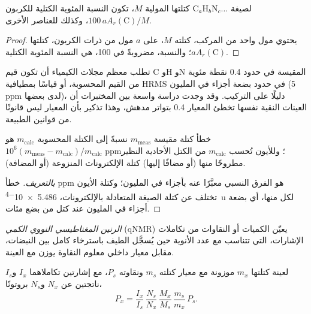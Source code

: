 \begin{proposition}\label{prop:b3:lab-techniques-3:mass-fractions}
لصيغة $\mathrm{C}_a\mathrm{H}_b\mathrm{N}_c\dots$ كتلتها المولية $M$، تكون النسبة المئوية الكتلية للكربون $100\,aA_r(\mathrm C)/M$، وكذلك
للعناصر الأخرى.
\end{proposition}

\begin{proof}
يحتوي مول واحد من المركب، كتلته $M$، على $a$ مول من ذرات الكربون، كتلتها $aA_r(\mathrm C)$؛
والنسبة، مضروبةً في 100، هي النسبة المئوية الكتلية.
\end{proof}

تطلب معظم مجلات الكيمياء أن تكون قيم C وH وN المقيسة في حدود 0.4 نقطة
مئوية من القيم المحسوبة، أو قياسًا بمطيافية HRMS في حدود بضعة أجزاء في المليون (5 ppm
لدى بعضها)، دليلًا على التركيب. وقد وجدت دراسة واسعة بين المختبرات أن
العينات النقية نفسها تخطئ المعيار 0.4 بتواتر مدهش، وهذا تذكير بأن
المعيار ليس قانونًا من قوانين الطبيعة.

\begin{proposition}\label{prop:b3:lab-techniques-3:ppm-error}
خطأ كتلة مقيسة $m_{\mathrm{meas}}$ نسبةً إلى الكتلة المحسوبة $m_{\mathrm{calc}}$ هو
$10^6(m_{\mathrm{meas}} - m_{\mathrm{calc}})/m_{\mathrm{calc}}$ ppm؛ وللأيون تُحسب $m_{\mathrm{calc}}$ من الكتل الأحادية النظير مطروحًا منها (أو مضافًا إليها)
كتلة الإلكترونات المنزوعة (أو المضافة).
\end{proposition}

\begin{proof}[بالتعريف]
خطأ ppm هو الفرق النسبي معبَّرًا عنه بأجزاء في المليون؛ 
وكتلة الأيون تختلف عن كتلة الصيغة المتعادلة بالإلكترونات، \qty{5.486e-4}{u} لكل منها، أي
بضعة أجزاء في المليون عند كتل من بضع مئات.
\end{proof}

\begin{definition}\label{def:b3:lab-techniques-3:qnmr}
\emph{الرنين المغناطيسي النووي الكمي} (qNMR) يعيّن الكميات أو
النقاوات من تكاملات الإشارات، التي تتناسب مع عدد الأنوية
حين يُسجَّل الطيف باسترخاء كامل بين النبضات، مقابل
معيار داخلي معلوم النقاوة يوزن مع العينة.
\end{definition}

\begin{proposition}\label{prop:b3:lab-techniques-3:qnmr}
لعينة كتلتها $m_x$ موزونة مع معيار كتلته $m_s$ ونقاوته $P_s$، مع إشارتين
تكاملاهما $I_x$ و$I_s$ ناتجتين عن $N_x$ و$N_s$ بروتونًا،
\[
  P_x = \frac{I_x}{I_s}\,\frac{N_s}{N_x}\,\frac{M_x}{M_s}\,\frac{m_s}{m_x}\,P_s.
\]
\end{proposition}

